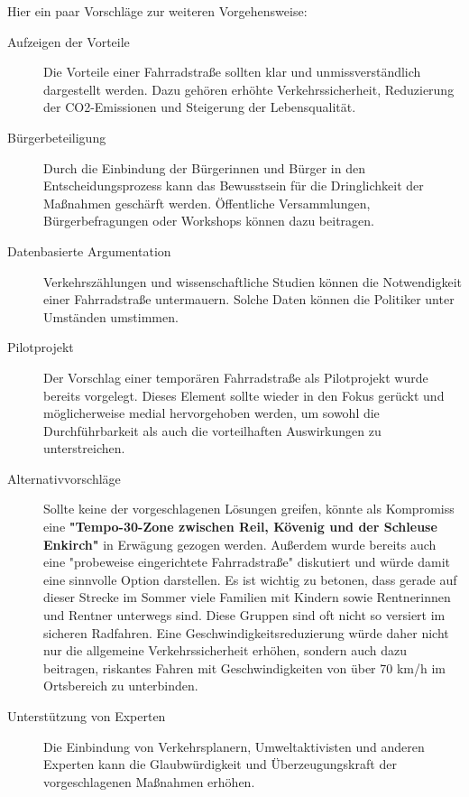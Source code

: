 Hier ein paar Vorschläge zur weiteren Vorgehensweise:
\begin{description}

\item[Aufzeigen der Vorteile]
Die Vorteile einer Fahrradstraße sollten klar und unmissverständlich dargestellt werden. Dazu gehören erhöhte Verkehrssicherheit, Reduzierung der CO2-Emissionen und Steigerung der Lebensqualität. 

\item[Bürgerbeteiligung]
Durch die Einbindung der Bürgerinnen und Bürger in den Entscheidungsprozess kann das Bewusstsein für die Dringlichkeit der Maßnahmen geschärft werden. Öffentliche Versammlungen, Bürgerbefragungen oder Workshops können dazu beitragen.

\item[Datenbasierte Argumentation]
Verkehrszählungen und wissenschaftliche Studien können die Notwendigkeit einer Fahrradstraße untermauern. Solche Daten können die Politiker unter Umständen umstimmen.

\item[Pilotprojekt]
Der Vorschlag einer temporären Fahrradstraße als Pilotprojekt wurde bereits vorgelegt. Dieses Element sollte wieder in den Fokus gerückt und möglicherweise medial hervorgehoben werden, um sowohl die Durchführbarkeit als auch die vorteilhaften Auswirkungen zu unterstreichen.

\item[Alternativvorschläge]
Sollte keine der vorgeschlagenen Lösungen greifen, könnte als Kompromiss eine \textbf{"Tempo-30-Zone zwischen Reil, Kövenig und der Schleuse Enkirch"} in Erwägung gezogen werden. Außerdem wurde bereits auch eine "probeweise eingerichtete Fahrradstraße" diskutiert und würde damit eine sinnvolle Option darstellen. Es ist wichtig zu betonen, dass gerade auf dieser Strecke im Sommer viele Familien mit Kindern sowie Rentnerinnen und Rentner unterwegs sind. Diese Gruppen sind oft nicht so versiert im sicheren Radfahren. Eine Geschwindigkeitsreduzierung würde daher nicht nur die allgemeine Verkehrssicherheit erhöhen, sondern auch dazu beitragen, riskantes Fahren mit Geschwindigkeiten von über 70 km/h im Ortsbereich zu unterbinden.

\item[Unterstützung von Experten]
Die Einbindung von Verkehrsplanern, Umweltaktivisten und anderen Experten kann die Glaubwürdigkeit und Überzeugungskraft der vorgeschlagenen Maßnahmen erhöhen.
\end{description}

